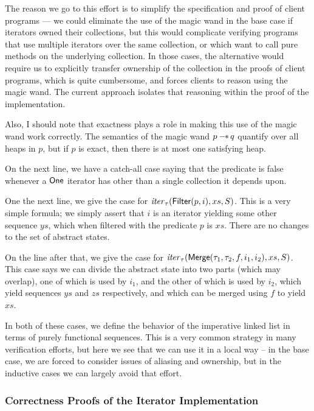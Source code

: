 The reason we go to this effort is to simplify the specification and
proof of client programs --- we could eliminate the use of the magic
wand in the base case if iterators owned their collections, but this
would complicate verifying programs that use multiple iterators over
the same collection, or which want to call pure methods on the
underlying collection. In those cases, the alternative would require
us to explicitly transfer ownership of the collection in the proofs of
client programs, which is quite cumbersome, and forces clients to
reason using the magic wand. The current approach isolates that
reasoning within the proof of the implementation.

Also, I should note that exactness plays a role in making this use of
the magic wand work correctly. The semantics of the magic wand $p
-\!\!*\, q$ quantify over all heaps in $p$, but if $p$ is exact, then
there is at most one satisfying heap. 

On the next line, we have a catch-all case saying that the predicate
is false whenever a $\mathsf{One}$ iterator has other than a single collection
it depends upon. 

One the next line, we give the case for $\mathit{iter}_\tau(\mathsf{Filter}(p, i),
xs, S)$.  This is a very simple formula; we simply assert that $i$ is
an iterator yielding some other sequence $ys$, which when filtered with
the predicate $p$ is $xs$. There are no changes to the set of abstract
states. 

On the line after that, we give the case for
$\mathit{iter}_\tau(\mathsf{Merge}(\tau_1, \tau_2, f, i_1, i_2), xs, S)$.  This
case says we can divide the abstract state into two parts (which may
overlap), one of which is used by $i_1$, and the other of which is
used by $i_2$, which yield sequences $ys$ and $zs$ respectively, and
which can be merged using $f$ to yield $xs$.

In both of these cases, we define the behavior of the imperative
linked list in terms of purely functional sequences. This is a very
common strategy in many verification efforts, but here we see that we
can use it in a local way -- in the base case, we are forced to
consider issues of aliasing and ownership, but in the inductive cases
we can largely avoid that effort.


\subsubsection{Correctness Proofs of the Iterator Implementation}

